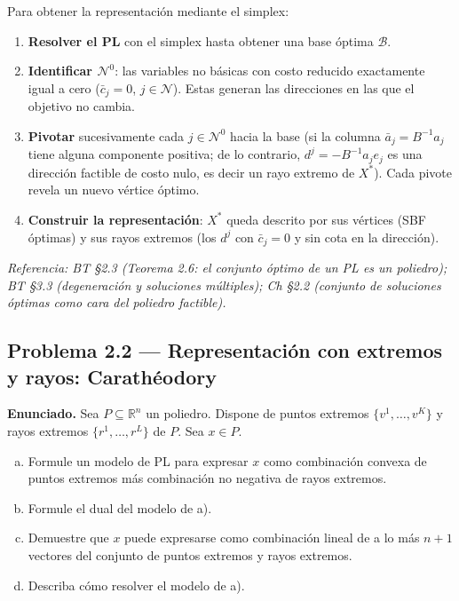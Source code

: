 \documentclass{article}
\begin{document}
Para obtener la representación mediante el simplex:
\begin{enumerate}[1.]
\item \textbf{Resolver el PL} con el simplex hasta obtener una base óptima $\mathcal{B}$.
\item \textbf{Identificar $\mathcal{N}^0$}: las variables no básicas con costo reducido exactamente igual a cero ($\bar{c}_j = 0$, $j \in \mathcal{N}$). Estas generan las direcciones en las que el objetivo no cambia.
\item \textbf{Pivotar} sucesivamente cada $j \in \mathcal{N}^0$ hacia la base (si la columna $\bar{a}_j = B^{-1}a_j$ tiene alguna componente positiva; de lo contrario, $d^j = -B^{-1}a_j e_j$ es una dirección factible de costo nulo, es decir un rayo extremo de $X^*$). Cada pivote revela un nuevo vértice óptimo.
\item \textbf{Construir la representación}: $X^*$ queda descrito por sus vértices (SBF óptimas) y sus rayos extremos (los $d^j$ con $\bar{c}_j = 0$ y sin cota en la dirección).
\end{enumerate}

\medskip\noindent\textit{Referencia: BT §2.3 (Teorema 2.6: el conjunto óptimo de un PL es un poliedro); BT §3.3 (degeneración y soluciones múltiples); Ch §2.2 (conjunto de soluciones óptimas como cara del poliedro factible).}

\newpage
\subsection*{Problema 2.2 — Representación con extremos y rayos: Carathéodory}

\textbf{Enunciado.} Sea $P \subseteq \mathbb{R}^n$ un poliedro. Dispone de puntos extremos $\{v^1, \ldots, v^K\}$ y rayos extremos $\{r^1, \ldots, r^L\}$ de $P$. Sea $x \in P$.
\begin{enumerate}[a)]
\item Formule un modelo de PL para expresar $x$ como combinación convexa de puntos extremos más combinación no negativa de rayos extremos.
\item Formule el dual del modelo de a).
\item Demuestre que $x$ puede expresarse como combinación lineal de a lo más $n+1$ vectores del conjunto de puntos extremos y rayos extremos.
\item Describa cómo resolver el modelo de a).
\end{enumerate}
\end{document}
